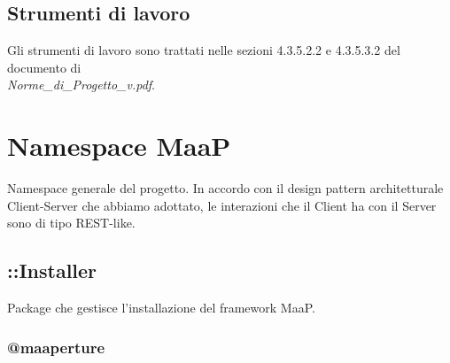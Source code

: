 

\subsection{Strumenti di lavoro}
Gli strumenti di lavoro sono trattati nelle sezioni 4.3.5.2.2 e 4.3.5.3.2 del documento di \\ \emph{Norme\_{}di\_{}Progetto\_{}v\versioneNormeDiProgetto{}.pdf}.


\newpage


\section{Namespace MaaP}
Namespace generale del progetto. In accordo con il design pattern architetturale Client-Server che 
abbiamo adottato, le interazioni che il Client ha con il Server sono di tipo REST-like.

\subsection{::Installer}
Package che gestisce l'installazione del framework MaaP. 


\subsubsection{@maaperture}

